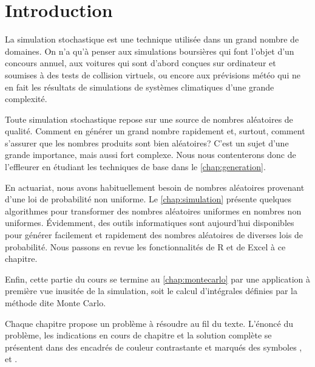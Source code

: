 
\chapter*{Introduction}

La simulation stochastique est une technique utilisée dans un grand
nombre de domaines. On n'a qu'à penser aux simulations boursières qui
font l'objet d'un concours annuel, aux voitures qui sont d'abord
conçues sur ordinateur et soumises à des tests de collision virtuels,
ou encore aux prévisions météo qui ne en fait les résultats de
simulations de systèmes climatiques d'une grande complexité.

Toute simulation stochastique repose sur une source de nombres
aléatoires de qualité. Comment en générer un grand nombre rapidement
et, surtout, comment s'assurer que les nombres produits sont bien
aléatoires? C'est un sujet d'une grande importance, mais aussi fort
complexe. Nous nous contenterons donc de l'effleurer en étudiant les
techniques de base dans le \autoref{chap:generation}.

En actuariat, nous avons habituellement besoin de nombres aléatoires
provenant d'une loi de probabilité non uniforme. Le
\autoref{chap:simulation} présente quelques algorithmes pour
transformer des nombres aléatoires uniformes en nombres non uniformes.
Évidemment, des outils informatiques sont aujourd'hui disponibles pour
générer facilement et rapidement des nombres aléatoires de diverses
lois de probabilité. Nous passons en revue les fonctionnalités de R et
de Excel à ce chapitre.

Enfin, cette partie du cours se termine au
\autoref{chap:montecarlo} par une application à première vue
inusitée de la simulation, soit le calcul d'intégrales définies par la
méthode dite Monte Carlo.

Chaque chapitre propose un problème à résoudre au fil du texte.
L'énoncé du problème, les indications en cours de chapitre et la
solution complète se présentent dans des encadrés de couleur
contrastante et marqués des symboles {\faCogs}, {\faBolt} et
{\faLightbulbO}.

